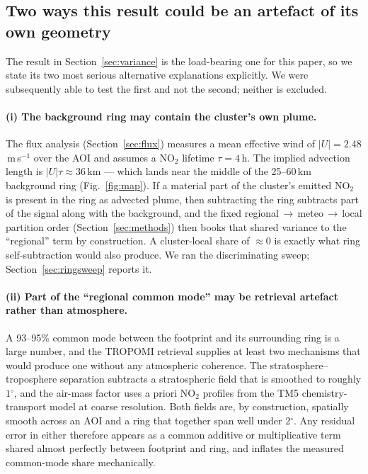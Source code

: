 \documentclass[11pt,a4paper]{article}
\providecommand{\degree}{\ensuremath{^{\circ}}}
\providecommand{\ce}[1]{\ensuremath{\mathrm{#1}}}
\begin{document}
\subsection{Two ways this result could be an artefact of its own geometry}
\label{sec:ringcaveat}

The result in Section~\ref{sec:variance} is the load-bearing one for this paper, so we state its
two most serious alternative explanations explicitly. We were subsequently able to test the first
and not the second; neither is excluded.

\paragraph{(i) The background ring may contain the cluster's own plume.} The flux analysis
(Section~\ref{sec:flux}) measures a mean effective wind of $|U|=2.48$\,m\,s$^{-1}$ over the AOI
and assumes a \ce{NO_2} lifetime $\tau=4$\,h. The implied advection length is
$|U|\tau\approx36$\,km --- which lands near the middle of the 25--60\,km background ring
(Fig.~\ref{fig:map}). If a material part of the cluster's emitted \ce{NO_2} is present in the
ring as advected plume, then subtracting the ring subtracts part of the signal along with the
background, and the fixed regional\,$\to$\,meteo\,$\to$\,local partition order
(Section~\ref{sec:methods}) then books that shared variance to the ``regional'' term by
construction. A cluster-local share of $\approx0$ is exactly what ring self-subtraction would
also produce. We ran the discriminating sweep; Section~\ref{sec:ringsweep} reports it.

\paragraph{(ii) Part of the ``regional common mode'' may be retrieval artefact rather than
atmosphere.} A 93--95\% common mode between the footprint and its surrounding ring is a large
number, and the TROPOMI retrieval supplies at least two mechanisms that would produce one without
any atmospheric coherence. The stratosphere--troposphere separation subtracts a stratospheric
field that is smoothed to roughly $1\degree$, and the air-mass factor uses a priori \ce{NO_2}
profiles from the TM5 chemistry-transport model at coarse resolution. Both fields are, by
construction, spatially smooth across an AOI and a ring that together span well under
$2\degree$. Any residual error in either therefore appears as a common additive or multiplicative
term shared almost perfectly between footprint and ring, and inflates the measured common-mode
share mechanically.
\end{document}
